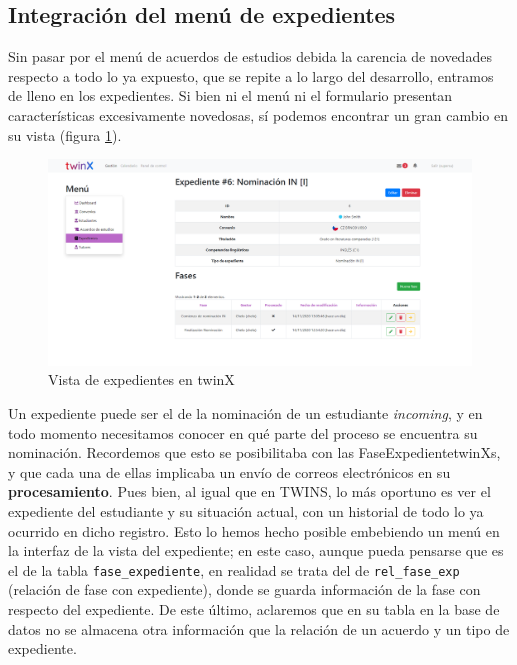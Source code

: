 \subsection{Integración del menú de expedientes}

Sin pasar por el menú de acuerdos de estudios debida la carencia de novedades respecto a todo lo ya expuesto, que se repite a lo largo del desarrollo, entramos de lleno en los expedientes. Si bien ni el menú ni el formulario presentan características excesivamente novedosas, sí podemos encontrar un gran cambio en su vista (figura \ref{fig:vistaexpedientetwinX}).

\begin{figure}
	\centering
	\includegraphics[width=\linewidth]{img/Capturas de twinX/vista_expediente}
	\caption{Vista de expedientes en twinX}
	\label{fig:vistaexpedientetwinX}
\end{figure}

Un expediente puede ser el de la nominación de un estudiante \textit{incoming}, y en todo momento necesitamos conocer en qué parte del proceso se encuentra su nominación. Recordemos que esto se posibilitaba con las \glspl{FaseExpedientetwinX}, y que cada una de ellas implicaba un envío de correos electrónicos en su \textbf{procesamiento}. Pues bien, al igual que en TWINS, lo más oportuno es ver el expediente del estudiante y su situación actual, con un historial de todo lo ya ocurrido en dicho registro. Esto lo hemos hecho posible embebiendo un menú en la interfaz de la vista del expediente; en este caso, aunque pueda pensarse que es el de la tabla \texttt{fase\_expediente}, en realidad se trata del de \texttt{rel\_fase\_exp} (relación de fase con expediente), donde se guarda información de la fase con respecto del expediente. De este último, aclaremos que en su tabla en la base de datos no se almacena otra información que la relación de un acuerdo y un tipo de expediente.

